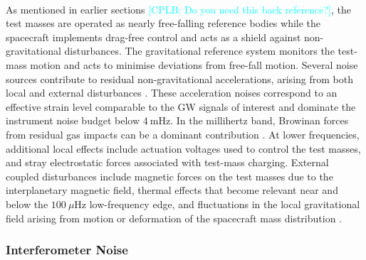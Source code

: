 \documentclass[a4paper,12pt]{article}
\newcommand{\cplb}[1]{\textcolor{cyan}{[CPLB: #1]}}
\begin{document}
\paragraph{}
As mentioned in earlier sections \cplb{Do you need this back reference?}, the test masses are operated as nearly free-falling reference bodies while the spacecraft implements drag-free control and acts as a shield against non-gravitational disturbances. The gravitational reference system monitors the test-mass motion and acts to minimise deviations from free-fall motion. Several noise sources contribute to residual non-gravitational accelerations, arising from both local and external disturbances \cite{colpiand2023lisa}. These acceleration noises correspond to an effective strain level comparable to the GW signals of interest and dominate the instrument noise budget below $4 ~\mathrm{mHz}$. In the millihertz band, Browinan forces from residual gas impacts can be a dominant contribution \cite{colpiand2023lisa}. At lower frequencies, additional local effects include actuation voltages used to control the test masses, and stray electrostatic forces associated with test-mass charging. External coupled disturbances include magnetic forces on the test masses due to the interplanetary magnetic field, thermal effects that become relevant near and below the  $100~\mu\mathrm{Hz}$ low-frequency edge, and fluctuations in the local gravitational field arising from motion or deformation of the spacecraft mass distribution \cite{colpiand2023lisa}.	

\subsubsection{Interferometer Noise}
\end{document}
